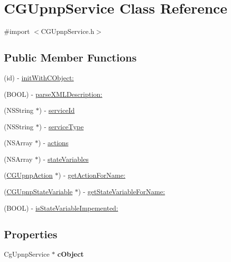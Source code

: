 \hypertarget{interface_c_g_upnp_service}{\section{C\-G\-Upnp\-Service Class Reference}
\label{interface_c_g_upnp_service}
}


{\ttfamily \#import $<$C\-G\-Upnp\-Service.\-h$>$}

\subsection*{Public Member Functions}
\begin{DoxyCompactItemize}
\item 
(id) -\/ \hyperlink{interface_c_g_upnp_service_a829255e6fa49142d1bea213e69c5463d}{init\-With\-C\-Object\-:}
\item 
(B\-O\-O\-L) -\/ \hyperlink{interface_c_g_upnp_service_a3278a41cf403c61f3bbafb12f236985a}{parse\-X\-M\-L\-Description\-:}
\item 
(N\-S\-String $\ast$) -\/ \hyperlink{interface_c_g_upnp_service_a847ab60141c97c9ea5d24838e776b1ee}{service\-Id}
\item 
(N\-S\-String $\ast$) -\/ \hyperlink{interface_c_g_upnp_service_aecb7a1a1fea8ede53ba6f287c72eaa8c}{service\-Type}
\item 
(N\-S\-Array $\ast$) -\/ \hyperlink{interface_c_g_upnp_service_a9c261921fc4e896b650988f78162d683}{actions}
\item 
(N\-S\-Array $\ast$) -\/ \hyperlink{interface_c_g_upnp_service_ab322496ca0cd5d8cf577fa9abca89450}{state\-Variables}
\item 
(\hyperlink{interface_c_g_upnp_action}{C\-G\-Upnp\-Action} $\ast$) -\/ \hyperlink{interface_c_g_upnp_service_a549760c8cc9f1d6c042f0e100fa9c0bf}{get\-Action\-For\-Name\-:}
\item 
(\hyperlink{interface_c_g_upnp_state_variable}{C\-G\-Upnp\-State\-Variable} $\ast$) -\/ \hyperlink{interface_c_g_upnp_service_a7fa3b89f728050c534d7f9970a7002cd}{get\-State\-Variable\-For\-Name\-:}
\item 
(B\-O\-O\-L) -\/ \hyperlink{interface_c_g_upnp_service_aecb173b092e8e6b9871d34addf2326ce}{is\-State\-Variable\-Impemented\-:}
\end{DoxyCompactItemize}
\subsection*{Properties}
\begin{DoxyCompactItemize}
\item 
\hypertarget{interface_c_g_upnp_service_a172cdfd30c178602737695cac7c1e087}{Cg\-Upnp\-Service $\ast$ {\bfseries c\-Object}}\label{interface_c_g_upnp_service_a172cdfd30c178602737695cac7c1e087}

\end{DoxyCompactItemize}


